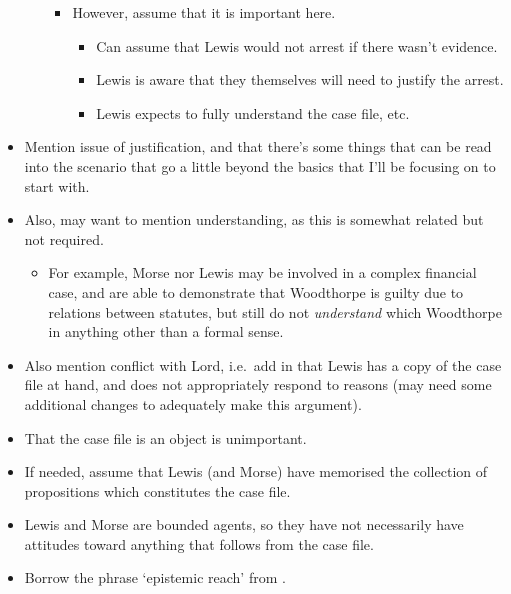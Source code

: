 \documentclass[10pt]{article}
\begin{document}
\begin{itemize}
\begin{itemize}
\begin{itemize}
\begin{itemize}
      \end{itemize}
    \item However, assume that it is important here.
      \begin{itemize}
      \item Can assume that Lewis would not arrest if there wasn't evidence.
      \item Lewis is aware that they themselves will need to justify the arrest.
      \item Lewis expects to fully understand the case file, etc.\
      \end{itemize}
    \end{itemize}
  \end{itemize}
\item Mention issue of justification, and that there's some things that can be read into the scenario that go a little beyond the basics that I'll be focusing on to start with.
\item Also, may want to mention understanding, as this is somewhat related but not required.
  \begin{itemize}
  \item For example, Morse nor Lewis may be involved in a complex financial case, and are able to demonstrate that Woodthorpe is guilty due to relations between statutes, but still do not \emph{understand} which Woodthorpe in anything other than a formal sense.
  \end{itemize}
\end{itemize}

\begin{itemize}
\item Also mention conflict with Lord, i.e.\ add in that Lewis has a copy of the case file at hand, and does not appropriately respond to reasons (may need some additional changes to adequately make this argument).
\end{itemize}

\begin{itemize}
\item That the case file is an object is unimportant.
\item If needed, assume that Lewis (and Morse) have memorised the collection of propositions which constitutes the case file.
\item Lewis and Morse are bounded agents, so they have not necessarily have attitudes toward anything that follows from the case file.
\item Borrow the phrase `epistemic reach' from \cite{Egan:2007aa}.
\end{itemize}
\end{document}
